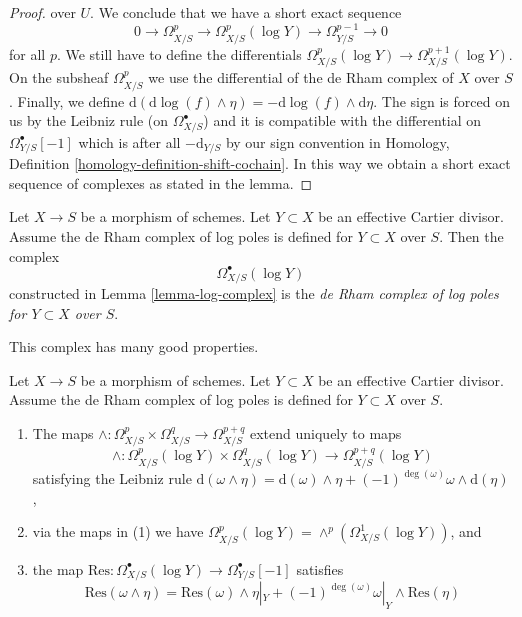 \begin{proof}
over $U$. We conclude that
we have a short exact sequence
$$
0 \to \Omega^p_{X/S} \to \Omega^p_{X/S}(\log Y) \to \Omega^{p - 1}_{Y/S} \to 0
$$
for all $p$. We still have to define the differentials
$\Omega^p_{X/S}(\log Y) \to \Omega^{p + 1}_{X/S}(\log Y)$.
On the subsheaf $\Omega^p_{X/S}$ we use the differential of
the de Rham complex of $X$ over $S$. Finally, we define
$\text{d}(\text{d}\log(f) \wedge \eta) = -\text{d}\log(f) \wedge \text{d}\eta$.
The sign is forced on us by the Leibniz rule (on $\Omega^\bullet_{X/S}$)
and it is compatible with the differential on $\Omega^\bullet_{Y/S}[-1]$
which is after all $-\text{d}_{Y/S}$ by our sign convention in
Homology, Definition \ref{homology-definition-shift-cochain}.
In this way we obtain a short exact
sequence of complexes as stated in the lemma.
\end{proof}

\begin{definition}
\label{definition-log-complex}
Let $X \to S$ be a morphism of schemes. Let $Y \subset X$ be an
effective Cartier divisor. Assume the de Rham complex of log poles
is defined for $Y \subset X$ over $S$. Then the complex
$$
\Omega^\bullet_{X/S}(\log Y)
$$
constructed in Lemma \ref{lemma-log-complex} is the
{\it de Rham complex of log poles for $Y \subset X$ over $S$}.
\end{definition}

\noindent
This complex has many good properties.

\begin{lemma}
\label{lemma-multiplication-log}
Let $X \to S$ be a morphism of schemes. Let $Y \subset X$ be an
effective Cartier divisor. Assume the de Rham complex of log poles
is defined for $Y \subset X$ over $S$.
\begin{enumerate}
\item The maps
$\wedge : \Omega^p_{X/S} \times \Omega^q_{X/S} \to \Omega^{p + q}_{X/S}$
extend uniquely to maps
$$
\wedge : \Omega^p_{X/S}(\log Y) \times \Omega^q_{X/S}(\log Y)
\to \Omega^{p + q}_{X/S}(\log Y)
$$
satisfying the Leibniz rule
$
\text{d}(\omega \wedge \eta) = \text{d}(\omega) \wedge \eta +
(-1)^{\deg(\omega)} \omega \wedge \text{d}(\eta)$,
\item via the maps in (1) we have $\Omega^p_{X/S}(\log Y) =
\wedge^p(\Omega^1_{X/S}(\log Y))$, and
\item the map
$\text{Res} : \Omega^\bullet_{X/S}(\log Y) \to \Omega^\bullet_{Y/S}[-1]$
satisfies
$$
\text{Res}(\omega \wedge \eta) =
\text{Res}(\omega) \wedge \eta|_Y +
(-1)^{\deg(\omega)} \omega|_Y \wedge \text{Res}(\eta)
$$
\end{enumerate}
\end{lemma}

